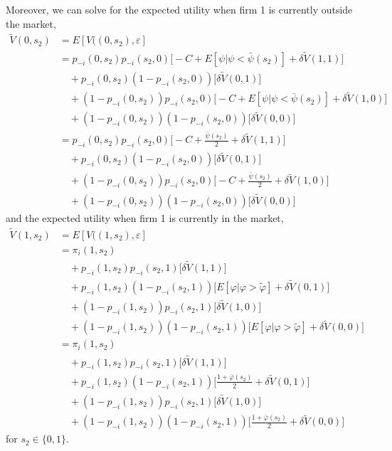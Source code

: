 \documentclass{article}
\begin{document}
\begin{enumerate}
\begin{answer}
Moreover, we can solve for the expected utility when firm 1 is currently outside the market,
\begin{align*}
    \tilde{V}(0,s_2) &= E[V((0,s_2),\varepsilon] \\
    &= p_{-i}(0,s_2)p_{-i}(s_2,0)\Bigr[-C + E[\psi|\psi<\bar{\psi}(s_2)] +\delta\tilde{V}(1,1)\Bigr]\\
    &\quad + p_{-i}(0,s_2)(1-p_{-i}(s_2,0))\Bigr[\delta\tilde{V}(0,1)\Bigr]\\
    &\quad + (1-p_{-i}(0,s_2))p_{-i}(s_2,0)\Bigr[-C + E[\psi|\psi<\bar{\psi}(s_2)] +\delta\tilde{V}(1,0)\Bigr]\\
    &\quad + (1-p_{-i}(0,s_2))(1-p_{-i}(s_2,0))\Bigr[\delta\tilde{V}(0,0)\Bigr] \\
    &= p_{-i}(0,s_2)p_{-i}(s_2,0)\Bigr[-C + \frac{\bar{\psi}(s_2)}{2} +\delta\tilde{V}(1,1)\Bigr]\\
    &\quad + p_{-i}(0,s_2)(1-p_{-i}(s_2,0))\Bigr[\delta\tilde{V}(0,1)\Bigr]\\
    &\quad + (1-p_{-i}(0,s_2))p_{-i}(s_2,0)\Bigr[-C + \frac{\bar{\psi}(s_2)}{2} +\delta\tilde{V}(1,0)\Bigr]\\
    &\quad + (1-p_{-i}(0,s_2))(1-p_{-i}(s_2,0))\Bigr[\delta\tilde{V}(0,0)\Bigr]
\end{align*}
and the expected utility when firm 1 is currently in the market,
\begin{align*}
    \tilde{V}(1,s_2) &= E[V((1,s_2),\varepsilon] \\
    &= \pi_i(1,s_2) \\
    &\quad + p_{-i}(1,s_2)p_{-i}(s_2,1)\Bigr[\delta\tilde{V}(1,1)\Bigr]\\
    &\quad + p_{-i}(1,s_2)(1-p_{-i}(s_2,1))\Bigr[E[\varphi | \varphi > \tilde{\varphi}] + \delta\tilde{V}(0,1)\Bigr]\\
    &\quad + (1-p_{-i}(1,s_2))p_{-i}(s_2,1)\Bigr[\delta\tilde{V}(1,0)\Bigr]\\
    &\quad + (1-p_{-i}(1,s_2))(1-p_{-i}(s_2,1))\Bigr[E[\varphi | \varphi > \tilde{\varphi}] + \delta\tilde{V}(0,0)\Bigr] \\
    &= \pi_i(1,s_2) \\
    &\quad + p_{-i}(1,s_2)p_{-i}(s_2,1)\Bigr[\delta\tilde{V}(1,1)\Bigr]\\
    &\quad + p_{-i}(1,s_2)(1-p_{-i}(s_2,1))\Bigr[\frac{1+\bar{\varphi}(s_2)}{2}+\delta\tilde{V}(0,1)\Bigr]\\
    &\quad + (1-p_{-i}(1,s_2))p_{-i}(s_2,1)\Bigr[\delta\tilde{V}(1,0)\Bigr]\\
    &\quad + (1-p_{-i}(1,s_2))(1-p_{-i}(s_2,1))\Bigr[\frac{1+\bar{\varphi}(s_2)}{2}+\delta\tilde{V}(0,0)\Bigr]
\end{align*}
for $s_2\in\{0,1\}$.


\end{answer}
\end{enumerate}
\end{document}
